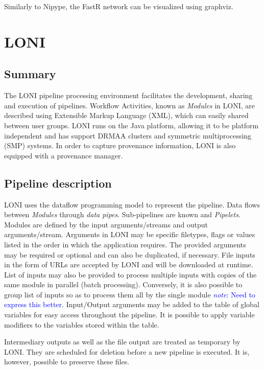 \documentclass{report}
\newcommand{\note}[1]{\textcolor{blue}{\textit{note}: #1}}
\begin{document}
    Similarly to Nipype, the FastR network can be visualized using graphviz.

         

    \section{LONI} \subsection{Summary} The LONI pipeline processing environment
    facilitates the development, sharing and execution of pipelines. Workflow
    Activities, known as \textit{Modules} in LONI, are described using
    Extensible Markup Language (XML), which can easily shared between user
    groups. LONI runs on the Java platform, allowing it to be platform
    independent and has support DRMAA clusters and symmetric multiprocessing
    (SMP) systems. In order to capture provenance information, LONI is also
    equipped with a provenance manager.
  
        \subsection{Pipeline description} LONI uses the dataflow programming
        model to represent the pipeline. Data flows between \textit{Modules}
        through \textit{data pipes}. Sub-pipelines are known and
        \textit{Pipelets}. Modules are defined by the input arguments/streams
        and output arguments/stream. Arguments in LONI may be specific
        filetypes, flags or values listed in the order in which the application
        requires. The provided arguments may be required or optional and can
        also be duplicated, if necessary. File inputs in the form of URLs are
        accepted by LONI and will be downloaded at runtime. List of inputs may
        also be provided to process multiple inputs with copies of the same
        module in parallel (batch processing). Conversely, it is also possible
        to group list of inputs so as to process them all by the single module
        \note{Need to express this better}. Input/Output arguments may be added
        to the table of global variables for easy access throughout the
        pipeline. It is possible to apply variable modifiers to the variables
        stored within the table.

Intermediary outputs as well as the file output are treated as temporary by
LONI. They are scheduled for deletion before a new pipeline is executed. It is,
however, possible to preserve these files. 
  
\end{document}
